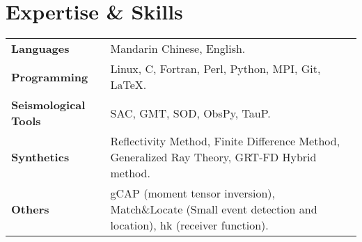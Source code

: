 \section*{Expertise \& Skills}

\begin{tabular}{p{} p{}}
\textbf{Languages} & Mandarin Chinese, English. \\
\textbf{Programming} & Linux, C, Fortran, Perl, Python, MPI, Git, LaTeX. \\
\textbf{Seismological Tools} & SAC, GMT, SOD, ObsPy, TauP. \\
\textbf{Synthetics} & Reflectivity Method, Finite Difference Method, Generalized Ray Theory, GRT-FD Hybrid method.\\
\textbf{Others} & gCAP (moment tensor inversion), Match\&Locate (Small event detection and location), hk (receiver function). \\
\end{tabular}
